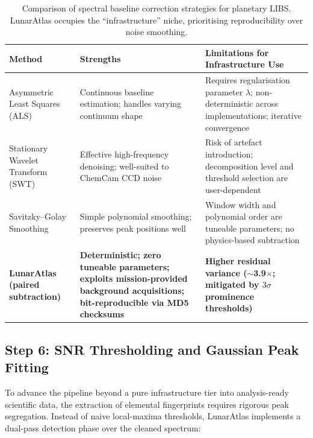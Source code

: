\documentclass[a4paper,twocolumn,10pt]{article}
\begin{document}
\begin{table}[!t]
\centering
\caption{Comparison of spectral baseline correction strategies for
  planetary LIBS.  LunarAtlas occupies the ``infrastructure'' niche,
  prioritising reproducibility over noise smoothing.}
\label{tab:method_comp}
\begin{tabularx}{\textwidth}{l X X}
\toprule
\textbf{Method} & \textbf{Strengths} & \textbf{Limitations for Infrastructure Use} \\
\midrule
Asymmetric Least Squares (ALS)~\cite{Clegg2017} & Continuous baseline estimation;
  handles varying continuum shape & Requires regularisation parameter
  $\lambda$; non-deterministic across implementations; iterative convergence \\
\addlinespace
Stationary Wavelet Transform (SWT)~\cite{Anderson2022} & Effective high-frequency
  denoising; well-suited to ChemCam CCD noise & Risk of artefact introduction;
  decomposition level and threshold selection are user-dependent \\
\addlinespace
Savitzky--Golay Smoothing~\cite{Sridhar2025} & Simple polynomial smoothing;
  preserves peak positions well & Window width and polynomial order
  are tuneable parameters; no physics-based subtraction \\
\addlinespace
\textbf{LunarAtlas (paired subtraction)} & \textbf{Deterministic;
  zero tuneable parameters; exploits mission-provided background
  acquisitions; bit-reproducible via MD5 checksums} & \textbf{Higher residual
  variance ($\sim$3.9$\times$; mitigated by $3\sigma$ prominence thresholds)} \\
\bottomrule
\end{tabularx}
\end{table}

\subsection{Step 6: SNR Thresholding and Gaussian Peak Fitting}

To advance the pipeline beyond a pure infrastructure tier into
analysis-ready scientific data, the extraction of elemental fingerprints
requires rigorous peak segregation.  Instead of naive local-maxima thresholds,
LunarAtlas implements a dual-pass detection phase over the cleaned spectrum:
\end{document}
